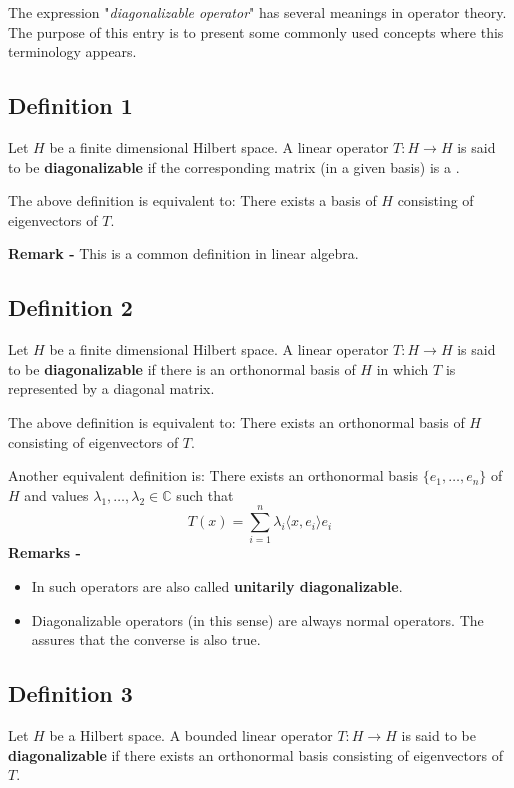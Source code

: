 \documentclass[12pt]{article}
\begin{document}

The expression "\emph{diagonalizable operator}" has several meanings in operator theory. The purpose of this entry is to present some commonly used concepts where this terminology appears.


\subsection{Definition 1}
Let $H$ be a finite dimensional Hilbert space. A linear operator $T:H\longrightarrow H$ is said to be {\bf diagonalizable} if the corresponding matrix (in a given basis) is a .

The above definition is equivalent to: There exists a basis of $H$ consisting of eigenvectors of $T$.

{\bf Remark -} This is a common definition in linear algebra.
\subsection{Definition 2}
Let $H$ be a finite dimensional Hilbert space. A linear operator $T:H\longrightarrow H$ is said to be {\bf diagonalizable} if there is an orthonormal basis of $H$ in which $T$ is represented by a diagonal matrix.

The above definition is equivalent to: There exists an orthonormal basis of $H$ consisting of eigenvectors of $T$.

Another equivalent definition is: There exists an orthonormal basis $\{e_1, \dots, e_n\}$ of $H$ and values $\lambda_1, \dots, \lambda_2 \in \mathbb{C}$ such that
\begin{displaymath}
T(x)=\sum_{i=1}^n \lambda_i \langle x, e_i \rangle e_i
\end{displaymath}
{\bf Remarks -}
\begin{itemize}
\item In  such operators are also called {\bf unitarily diagonalizable}.
\item Diagonalizable operators (in this sense) are always normal operators. The  assures that the converse is also true.
\end{itemize}

\subsection{Definition 3}
Let $H$ be a Hilbert space. A bounded linear operator $T:H\longrightarrow H$ is said to be {\bf diagonalizable} if there exists an orthonormal basis consisting of eigenvectors of $T$.
\end{document}
